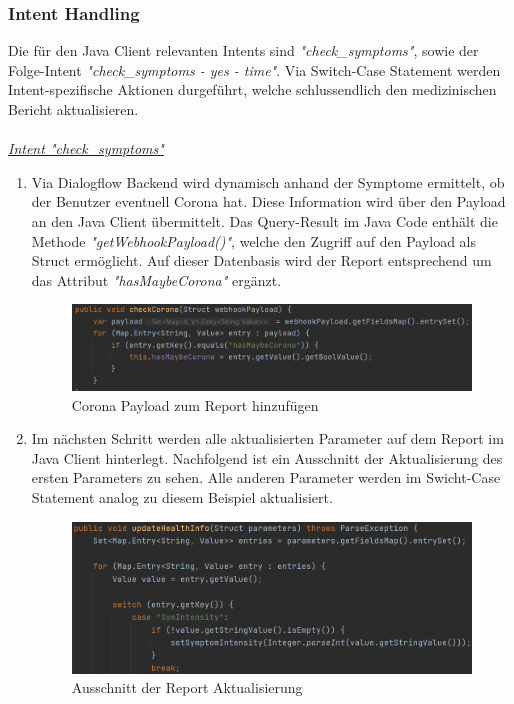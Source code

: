 \documentclass[11pt,a4paper]{article}
\begin{document}
		\subsubsection{Intent Handling} \label{sssec:intent_handling}			
		Die für den Java Client relevanten Intents sind \emph{"check\_symptoms"}, sowie der Folge-Intent \emph{"check\_symptoms - yes - time"}. Via Switch-Case Statement werden Intent-spezifische Aktionen durgeführt, welche schlussendlich den medizinischen Bericht aktualisieren. \\\\
		
		\underline{\emph{Intent "check\_symptoms"}} \\
		\begin{enumerate}
			\item Via Dialogflow Backend wird dynamisch anhand der Symptome ermittelt, ob der Benutzer eventuell Corona hat. Diese Information wird über den Payload an den Java Client übermittelt. Das Query-Result im Java Code enthält die Methode \emph{"getWebhookPayload()"}, welche den Zugriff auf den Payload als Struct ermöglicht. Auf dieser Datenbasis wird der Report entsprechend um das Attribut \emph{"hasMaybeCorona"} ergänzt.
			\begin{figure}[h!]
				\begin{center}
            		\includegraphics[width=0.8\linewidth]{JavaClient-CoronaCheck.png}
					\caption{Corona Payload zum Report hinzufügen}
					\label{fig:javaClient_coronaCheck}
				\end{center}
			\end{figure}
			
			\item Im nächsten Schritt werden alle aktualisierten Parameter auf dem Report im Java Client hinterlegt. Nachfolgend ist ein Ausschnitt der Aktualisierung des ersten Parameters zu sehen. Alle anderen Parameter werden im Swicht-Case Statement analog zu diesem Beispiel aktualisiert.
			\begin{figure}[h!]
				\begin{center}
            		\includegraphics[width=0.8\linewidth]{JavaClient-ParameterHandling.png}
					\caption{Ausschnitt der Report Aktualisierung}
					\label{fig:javaClient_parameterHandling}
				\end{center}
			\end{figure}
		\end{enumerate}
		
\end{document}
